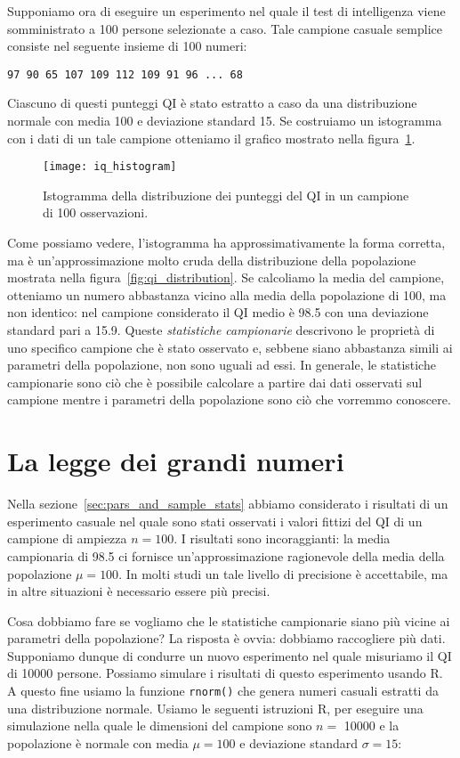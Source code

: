 Supponiamo ora di eseguire un esperimento nel quale il test di intelligenza viene somministrato a 100 persone selezionate a caso.
Tale campione casuale semplice consiste nel seguente insieme di 100 numeri:
\begin{lstlisting}
97 90 65 107 109 112 109 91 96 ... 68
\end{lstlisting}
\noindent
Ciascuno di questi punteggi QI è stato estratto a caso da una distribuzione normale con media 100 e deviazione standard 15. 
Se costruiamo un istogramma con i dati di un tale campione otteniamo il grafico mostrato nella figura~\ref{fig:qi_hist_1}. 

\begin{figure}[h!]
\centering
\texttt{[image: iq\_histogram]}
\caption{Istogramma della distribuzione dei punteggi del QI in un campione di 100 osservazioni.}
\label{fig:qi_hist_1}
\end{figure}

Come possiamo vedere, l'istogramma ha approssimativamente la forma corretta, ma è un'approssimazione molto cruda della distribuzione della popolazione mostrata nella figura~\ref{fig:qi_distribution}. 
Se calcoliamo la media del campione, otteniamo un numero abbastanza vicino alla media della popolazione di 100, ma non identico: nel campione considerato il QI medio è 98.5 con una deviazione standard pari a 15.9. 
Queste \emph{statistiche campionarie} descrivono le proprietà di uno specifico campione che è stato osservato e, sebbene siano abbastanza simili ai parametri della popolazione, non sono uguali ad essi.
In generale, le statistiche campionarie sono ciò che è possibile calcolare a partire dai dati osservati sul campione mentre i parametri della popolazione sono ciò che vorremmo conoscere.


\section{La legge dei grandi numeri}

Nella sezione~\ref{sec:pars_and_sample_stats} abbiamo considerato i risultati di un esperimento  casuale nel quale sono stati osservati i valori fittizi del QI di un campione di ampiezza $n = 100$.
I risultati sono incoraggianti: la media campionaria di 98.5 ci fornisce un'approssimazione ragionevole della media della popolazione $\mu = 100$. 
In molti studi un tale livello di precisione è accettabile, ma in altre situazioni è necessario essere più precisi. 

Cosa dobbiamo fare se vogliamo che le statistiche campionarie siano più vicine ai parametri della popolazione?
La risposta è ovvia: dobbiamo raccogliere più dati. 
Supponiamo dunque di condurre un nuovo esperimento nel quale misuriamo il QI di \num{10000} persone. 
Possiamo simulare i risultati di questo esperimento usando R. 
A questo fine usiamo la funzione \verb+rnorm()+ che genera numeri casuali estratti da una distribuzione normale. 
Usiamo le seguenti istruzioni R, per eseguire una simulazione nella quale le dimensioni del campione sono $n =$ \num{10000} e la popolazione è normale con media $\mu = 100$ e deviazione standard $\sigma = 15$:

